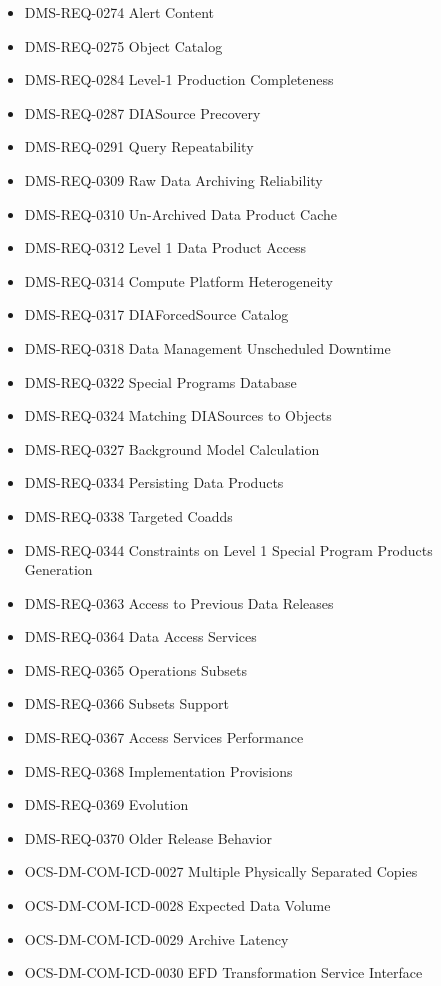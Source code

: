 \begin{itemize}
\item DMS-REQ-0274 Alert Content
\item DMS-REQ-0275 Object Catalog
\item DMS-REQ-0284 Level-1 Production Completeness
\item DMS-REQ-0287 DIASource Precovery
\item DMS-REQ-0291 Query Repeatability
\item DMS-REQ-0309 Raw Data Archiving Reliability
\item DMS-REQ-0310 Un-Archived Data Product Cache
\item DMS-REQ-0312 Level 1 Data Product Access
\item DMS-REQ-0314 Compute Platform Heterogeneity
\item DMS-REQ-0317 DIAForcedSource Catalog
\item DMS-REQ-0318 Data Management Unscheduled Downtime
\item DMS-REQ-0322 Special Programs Database
\item DMS-REQ-0324 Matching DIASources to Objects
\item DMS-REQ-0327 Background Model Calculation
\item DMS-REQ-0334 Persisting Data Products
\item DMS-REQ-0338 Targeted Coadds
\item DMS-REQ-0344 Constraints on Level 1 Special Program Products Generation
\item DMS-REQ-0363 Access to Previous Data Releases
\item DMS-REQ-0364 Data Access Services
\item DMS-REQ-0365 Operations Subsets
\item DMS-REQ-0366 Subsets Support
\item DMS-REQ-0367 Access Services Performance
\item DMS-REQ-0368 Implementation Provisions
\item DMS-REQ-0369 Evolution
\item DMS-REQ-0370 Older Release Behavior
\item OCS-DM-COM-ICD-0027 Multiple Physically Separated Copies
\item OCS-DM-COM-ICD-0028 Expected Data Volume
\item OCS-DM-COM-ICD-0029 Archive Latency
\item OCS-DM-COM-ICD-0030 EFD Transformation Service Interface
\end{itemize}
